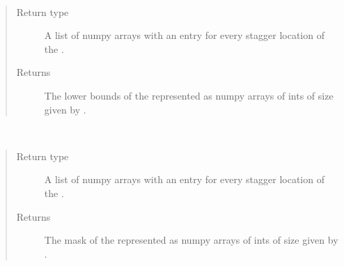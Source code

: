 \documentclass[letterpaper,10pt,english]{sphinxmanual}
\begin{document}
\begin{fulllineitems}

\begin{fulllineitems}
\label{\detokenize{grid:ESMF.api.grid.Grid.lower_bounds}}~\begin{quote}\begin{description}
\item[{Return type}] \leavevmode
A list of numpy arrays with an entry for every stagger location
of the {\hyperref[\detokenize{grid:ESMF.api.grid.Grid}]{}}.

\item[{Returns}] \leavevmode
The lower bounds of the {\hyperref[\detokenize{grid:ESMF.api.grid.Grid}]{}}
represented as numpy arrays of ints of size given by
.

\end{description}\end{quote}

\end{fulllineitems}


\begin{fulllineitems}
\label{\detokenize{grid:ESMF.api.grid.Grid.mask}}~\begin{quote}\begin{description}
\item[{Return type}] \leavevmode
A list of numpy arrays with an entry for every stagger location
of the {\hyperref[\detokenize{grid:ESMF.api.grid.Grid}]{}}.

\item[{Returns}] \leavevmode
The mask of the {\hyperref[\detokenize{grid:ESMF.api.grid.Grid}]{}} represented as
numpy arrays of ints of size given by \textasciigrave{}
.

\end{description}\end{quote}


\end{fulllineitems}
\end{fulllineitems}
\end{document}
